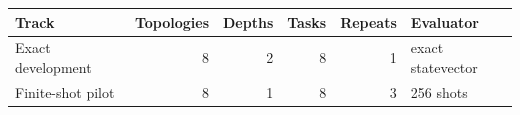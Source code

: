 \begin{tabular}{lrrrrl}
\toprule
Track & Topologies & Depths & Tasks & Repeats & Evaluator \\
\midrule
Exact development & 8 & 2 & 8 & 1 & exact statevector \\
Finite-shot pilot & 8 & 1 & 8 & 3 & 256 shots \\
\bottomrule
\end{tabular}
